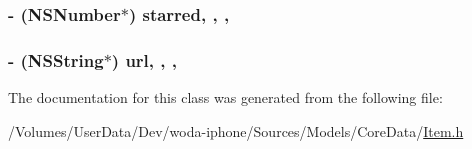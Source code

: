 \hypertarget{interface_item_a51542772ade5b09d3bf610ac1d08e50f}{
\subsubsection[{starred}]{\setlength{\rightskip}{0pt plus 5cm}-\/ (N\-S\-Number$\ast$) starred\hspace{0.3cm}{\ttfamily [read]}, {\ttfamily [write]}, {\ttfamily [nonatomic]}, {\ttfamily [retain]}}}\label{interface_item_a51542772ade5b09d3bf610ac1d08e50f}
\hypertarget{interface_item_afae08fe83da83ab2df5aabe74b8c4180}{
\subsubsection[{url}]{\setlength{\rightskip}{0pt plus 5cm}-\/ (N\-S\-String$\ast$) url\hspace{0.3cm}{\ttfamily [read]}, {\ttfamily [write]}, {\ttfamily [nonatomic]}, {\ttfamily [retain]}}}\label{interface_item_afae08fe83da83ab2df5aabe74b8c4180}


The documentation for this class was generated from the following file\-:\begin{DoxyCompactItemize}
\item 
/\-Volumes/\-User\-Data/\-Dev/woda-\/iphone/\-Sources/\-Models/\-Core\-Data/\hyperlink{_item_8h}{Item.\-h}\end{DoxyCompactItemize}
